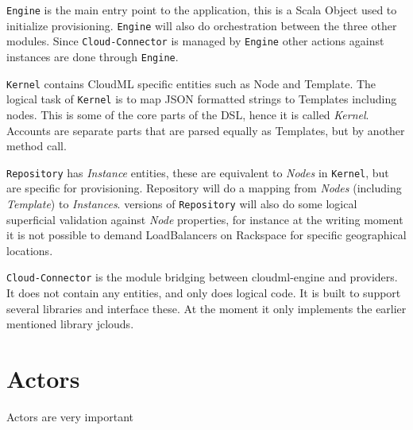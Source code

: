 \texttt{Engine} is the main entry point to the application, this is a Scala Object used to initialize
provisioning.
\texttt{Engine} will also do orchestration between the three other modules.
Since \texttt{Cloud-Connector} is managed by \texttt{Engine} other actions against 
instances are done through \texttt{Engine}.

\texttt{Kernel} contains CloudML specific entities such as Node and Template.
The logical task of \texttt{Kernel} is to map JSON formatted strings to Templates including nodes.
This is some of the core parts of the DSL, hence it is called \emph{Kernel}.
Accounts are separate parts that are parsed equally as Templates, but by another method call.

\texttt{Repository} has \emph{Instance} entities, these are equivalent to \emph{Nodes} in \texttt{Kernel},
but are specific for provisioning. Repository will do a mapping from \emph{Nodes} (including \emph{Template})
to \emph{Instances}.  versions of \texttt{Repository} will also do some logical superficial validation
against \emph{Node} properties, for instance at the writing moment it is not possible to 
demand LoadBalancers on Rackspace for specific geographical locations.

\texttt{Cloud-Connector} is the module bridging between cloudml-engine and providers.
It does not contain any entities, and only does logical code. 
It is built to support several libraries and interface these. At the moment it only implements the earlier
mentioned library jclouds.

\section{Actors}

Actors are very important
